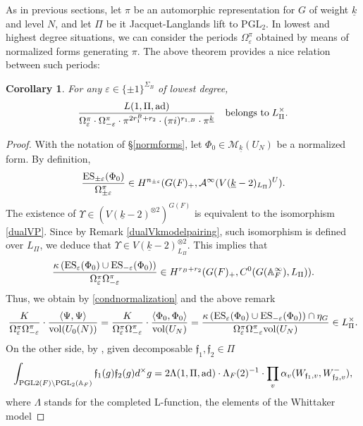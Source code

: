 \documentclass{amsart}
\newtheorem{corollary}[theorem]{Corollary}
\theoremstyle{definition}
\theoremstyle{remark}
\numberwithin{equation}{section}
\newcommand{\PGL}{{\mathrm{PGL}}}
\newcommand{\A}{{\mathbb A}}
\newcommand{\cA}{{\mathcal A}}
\newcommand{\cM}{{\mathcal M}}
\begin{document}
As in previous sections, let $\pi$ be an automorphic representation for $G$ of weight $\underline k$ and level $N$, and let $\Pi$ be it Jacquet-Langlands lift to $\PGL_2$. In lowest and highest degree situations, we can consider the periods $\Omega_\varepsilon^\pi$ obtained by means of normalized forms generating $\pi$. The above theorem provides a nice relation between such periods:
\begin{corollary}\label{cor3}
    For any $\varepsilon\in \{\pm1\}^{\Sigma_B}$ of lowest degree,
    \[
\frac{L(1,\Pi,{\rm ad})}{\Omega^\pi_\varepsilon\cdot \Omega^\pi_{-\varepsilon}\cdot \pi^{2r_1^B+r_2}\cdot(\pi i)^{r_{1,B}}\cdot\pi^{\underline k} }\quad\text{belongs to}\; L_\Pi^\times. 
\]

\end{corollary}
\begin{proof}
With the notation of \S\ref{normforms}, let $\Phi_0\in \cM_{\underline k}(U_N)$ be a normalized form. By definition, 
\[
\frac{{\rm ES}_{\pm\varepsilon}(\Phi_0)}{\Omega^\pi_{\pm\varepsilon}}\in H^{n_{\pm\varepsilon}}(G(F)_+,\cA^{\infty}(V(\underline k-2)_{L_\Pi})^U).
\]
The existence of $\Upsilon\in \left(V(\underline k-2)^{\otimes 2}\right)^{G(F)}$ is equivalent to the isomorphism \eqref{dualVP}. Since by Remark \ref{dualVkmodelpairing}, such isomorphism is defined over $L_\Pi$, we deduce that $\Upsilon\in V(\underline k-2)_{L_\Pi}^{\otimes 2}$. This implies that
\[
\frac{\kappa\left({\rm ES}_\varepsilon(\Phi_0)\cup {\rm ES}_{-\varepsilon}(\Phi_0)\right)}{\Omega^\pi_\varepsilon \Omega^\pi_{-\varepsilon}}\in H^{r_B+r_2}(G(F)_+,C^0(G(\A_F^\infty),L_\Pi)).
\]
Thus, we obtain by \eqref{condnormalization} and the above remark
\[
\frac{K}{\Omega^\pi_\varepsilon\Omega^\pi_{-\varepsilon}}\cdot  \frac{\langle\Psi,\Psi\rangle}{{\rm vol}(U_0(N))}=\frac{K}{\Omega^\pi_\varepsilon\Omega^\pi_{-\varepsilon}}\cdot  \frac{\langle\Phi_0,\Phi_0\rangle}{{\rm vol}(U_N)}=\frac{\kappa\left({\rm ES}_\varepsilon(\Phi_0)\cup {\rm ES}_{-\varepsilon}(\Phi_0)\right)\cap\eta_G}{\Omega^\pi_\varepsilon \Omega^\pi_{-\varepsilon}{\rm vol}(U_N)}\in L_\Pi^\times.
\]
On the other side, by \cite[Proposition 2.1]{CST}, given decomposable $\mathfrak{f}_1,\mathfrak{f}_2\in \Pi$
    \begin{equation}\label{defpetersson}
    \int_{\PGL2(F)\backslash \PGL_2(\A_F)}\mathfrak{f}_1(g)\mathfrak{f}_2(g)d^\times g=2\Lambda(1,\Pi,{\rm ad})\cdot \Lambda_F(2)^{-1}\cdot\prod_v\alpha_v(W_{\mathfrak{f}_1,v},W^-_{\mathfrak{f}_2,v}),
\end{equation}
where $\Lambda$ stands for the completed L-function, the elements of the Whittaker model

\end{proof}
\end{document}
